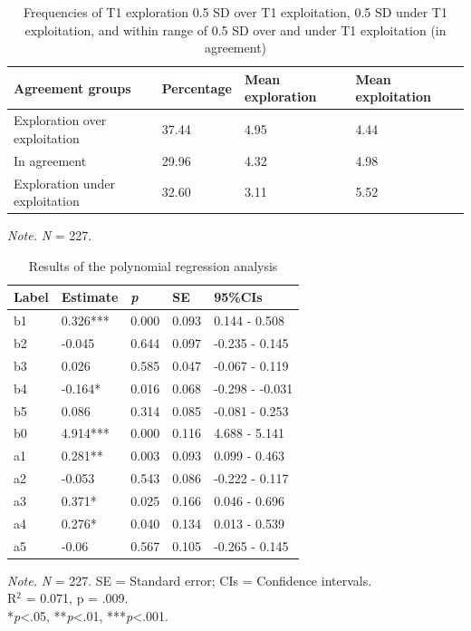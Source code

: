 \documentclass[man, 12pt, a4paper, noextraspace]{apa6}
\begin{document}
\begin{table}[htb]
\caption{Frequencies of T1 exploration 0.5 SD over T1 exploitation, 0.5 SD under T1 exploitation, and within range of 0.5 SD over and under T1 exploitation (in agreement)}
\begin{tabular}{p{6.0cm}lll}
\toprule
Agreement groups & Percentage & Mean exploration & Mean exploitation \\
\midrule
Exploration over exploitation & 37.44 & 4.95 & 4.44\\
In agreement & 29.96 & 4.32 & 4.98\\
Exploration under exploitation & 32.60 & 3.11 & 5.52\\
\bottomrule
\end{tabular}
\smallskip
\begin{tablenotes}
{\small
\textit{Note.} \textit{N} = 227. 
}
\end{tablenotes}
\end{table}


\begin{table}[ht]
\caption{Results of the polynomial regression analysis}
\begin{tabular}{p{1.5cm}p{2.0cm}p{1.5cm}p{1.5cm}p{2.5cm}}
\toprule
Label & Estimate & \textit{p} & SE & 95\%CIs \\ 
\midrule
b1 & 0.326*** & 0.000 & 0.093 & 0.144 - 0.508 \\ 
  b2 & -0.045  & 0.644 & 0.097 & -0.235 - 0.145 \\ 
  b3 & 0.026  & 0.585 & 0.047 & -0.067 - 0.119 \\ 
  b4 & -0.164* & 0.016 & 0.068 & -0.298 - -0.031 \\ 
  b5 & 0.086  & 0.314 & 0.085 & -0.081 - 0.253 \\ 
  b0 & 4.914*** & 0.000 & 0.116 & 4.688 - 5.141 \\ 
  a1 & 0.281** & 0.003 & 0.093 & 0.099 - 0.463 \\ 
  a2 & -0.053  & 0.543 & 0.086 & -0.222 - 0.117 \\ 
  a3 & 0.371* & 0.025 & 0.166 & 0.046 - 0.696 \\ 
  a4 & 0.276* & 0.040 & 0.134 & 0.013 - 0.539 \\ 
  a5 & -0.06  & 0.567 & 0.105 & -0.265 - 0.145 \\ 
\bottomrule
\end{tabular}
\smallskip
\begin{tablenotes}
{\small
\textit{Note.} \textit{N} = 227. SE = Standard error; CIs = Confidence intervals. \\ R$^2$ = 0.071, p = .009. \\ *\textit{p}<.05, **\textit{p}<.01, ***\textit{p}<.001.  
}
\end{tablenotes}
\end{table}
\end{document}
